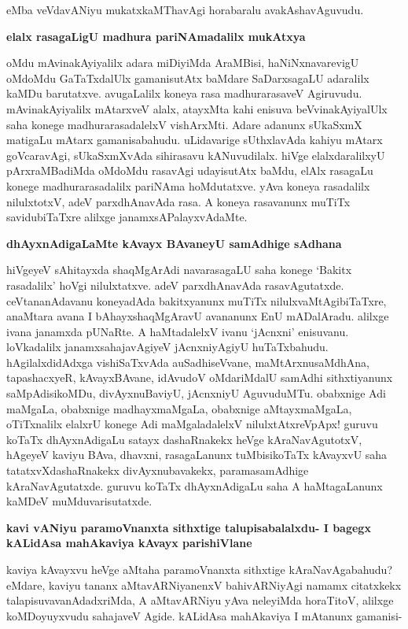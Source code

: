 \noindent
eMba veVdavANiyu mukatxkaMThavAgi horabaralu avakAshavAguvudu.

{\bigskip
\noindent
{\large\bf elalx rasagaLigU madhura pariNAmadalilx mukAtxya}}\label{page231}
\medskip

\noindent
oMdu mAvinakAyiyalilx adara miDiyiMda AraMBisi, haNiNxnavarevigU oMdoMdu GaTaTx\-dalUlx gamanisutAtx baMdare SaDarxsagaLU adaralilx kaMDu barutatxve. avugaLalilx koneya rasa madhura\-rasaveV Agiruvudu. mAvinakAyiyalilx mAtarxveV alalx, atayxMta kahi enisuva beVvinakAyiyalUlx saha konege\- madhurarasadalelxV vishArxMti. Adare adanunx sUkaSxmX matigaLu mAtarx gamanisabahudu. uLidavarige sUthxla\-vAda kahiyu mAtarx goVcaravAgi, sUkaSxmXvAda sihirasavu kANuvudilalx. hiVge elalxdaralilxyU pArxraMBa\-diMda oMdoMdu rasavAgi udayisutAtx baMdu, elAlx rasagaLu konege madhurarasadalilx pari\-NAma hoMdutatxve. yAva koneya rasadalilx nilulxtotxV, adeV parxdhAnavAda rasa. A koneya rasavanunx muTiTx savidubiTaTxre alilxge janamxsAPalayxvAdaMte.

{\bigskip
\noindent
{\large\bf dhAyxnAdigaLaMte kAvayx BAvaneyU samAdhige sAdhana}}\label{231}
\medskip

\noindent
hiVgeyeV sAhitayxda shaqMgArAdi navarasagaLU saha konege `Bakitx rasadalilx' hoVgi nilulxtatxve. adeV parxdhAnavAda rasavAgutatxde. ceVtananAdavanu koneyadAda bakitxyanunx muTiTx nilulxvaMtAgibiTaTxre, anaM\-tara avana I bAhayxshaqMgAravU avananunx EnU mADalAradu. alilxge ivana janamxda pUNaRte. A haMtadalelxV ivanu `jAcnxni' enisuvanu. loVkadalilx janamxsahajavAgiyeV jAcnxniyAgiyU huTaTx\-bahudu. hAgilalxdidAdxga vishiSaTxvAda auSadhiseVvane, maMtArxnusaMdhAna, tapashacxyeR, kAvayxBAvane, idA\-vudoV oMdariMdalU samAdhi sithxtiyanunx saMpAdisikoMDu, divAyxnuBaviyU, jAcnxniyU Aguvu\-duMTu. obabxnige Adi maMgaLa, obabxnige madhayxmaMgaLa, obabxnige aMtayxmaMgaLa, oTiTxnalilx elalxrU konege Adi\- maMgaladalelxV nilulxtAtxreVpApx! guruvu koTaTx dhAyxnAdigaLu satayx dashaRnakekx heVge kAraNavAgutotxV, hAge\-yeV kaviyu BAva, dhavxni, rasagaLanunx tuMbisikoTaTx kAvayxvU saha tatatxvXdashaRnakekx divAyxnubavakekx, parama\-samA\-dhige kAraNavAgutatxde. guruvu koTaTx dhAyxnAdigaLu saha A haMtagaLanunx kaMDeV muMduvarisutatxde.

\newpage
{\noindent
{\large\bf kavi vANiyu paramoVnanxta sithxtige talupisabalalxdu- I bagegx kALidAsa mahAkaviya kAvayx pari\-shiVlane}}\label{page232}
\medskip

\noindent
kaviya kAvayxvu heVge aMtaha paramoVnanxta sithxtige kAraNavAgabahudu? eMdare, kaviyu tananx aMta\-vARNiyanenxV bahivARNiyAgi namamx citatxkekx talapisuvavanAdadxriMda, A aMtavARNiyu yAva nele\-yiMda horaTitoV, alilxge koMDoyuyxvudu sahajaveV Agide. kALidAsa mahAkaviya I mAtanunx gamanisi-

